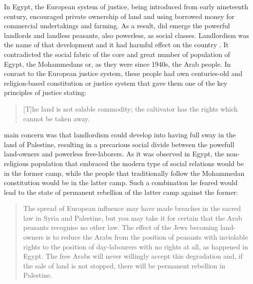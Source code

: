 In Egypt, the European system of justice, being introduced from early nineteenth century, encouraged private ownership of land and using borrowed money for commercial undertakings and farming. As a result, did emerge the powerful landlords and landless peasants, also powerless, as social classes. Landlordism was the name of that development and it had harmful effect on the country \citep{innes1909}. It contradicted the social fabric of the core and great number of population of Egypt, the Mohammedans or, as they were since 1940s, the Arab people. In conrast to the European justice system, these people had own centuries-old and religion-based constitution or justice system that gave them one of the key principles of justice stating:

\begin{quote}
[T]he land is not salable commodity; the caltivator has the rights which cannot be taken away.~\citep{innes1940}
\end{quote}

\citeauthor{innes1940} main concern was that landlordism could develop into having full sway in the land of Palestine, resulting in a precarious social divide between the powefull land-owners and powerless free-laborers. As it was observed in Egypt, the non-religious population that embraced the modern type of social relations would be in the former camp, while the people that traditionally follow the Mohammedan constitution would be in the latter camp. Such a combination he feared would lead to the state of permanent rebellion of the latter camp against the former: 

\begin{quote}
The spread of European influence may have made breaches in the sacred law in Syria and Palestine, but you may take it for certain that the Arab peasants recognise no other law. The effect of the Jews becoming land-owners is to reduce the Arabs from the position of peasants with inviolable rights to the position of day-labourers with no rights at all, as happened in Egypt. The free Arabs will never willingly accept this degradation and, if the sale of land is not stopped, there will be permanent rebellion in Palestine.~\citep{innes1940}
\end{quote}

